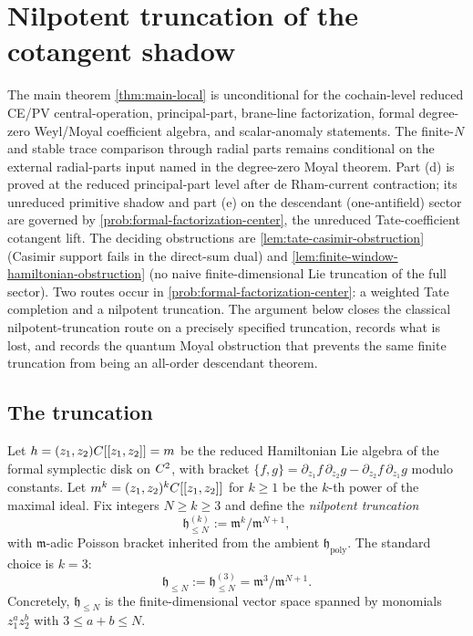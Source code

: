 
\section*{Nilpotent truncation of the cotangent shadow}

The main theorem \ref{thm:main-local} is unconditional for the
cochain-level reduced CE/PV central-operation, principal-part, brane-line factorization,
formal degree-zero Weyl/Moyal coefficient algebra, and scalar-anomaly
statements.  The finite-\(N\) and stable trace comparison through
radial parts remains conditional on the external radial-parts input
named in the degree-zero Moyal theorem.
Part (d) is proved at the reduced principal-part level after de Rham-current contraction;
its unreduced primitive shadow and part (e) on the descendant
(one-antifield) sector are governed by
\ref{prob:formal-factorization-center}, the unreduced Tate-coefficient
cotangent lift. The deciding obstructions are
\ref{lem:tate-casimir-obstruction} (Casimir support fails in the
direct-sum dual) and \ref{lem:finite-window-hamiltonian-obstruction}
(no naive finite-dimensional Lie truncation of the full sector). Two
routes occur in \ref{prob:formal-factorization-center}: a
weighted Tate completion and a nilpotent truncation. The argument below
closes the classical nilpotent-truncation route on a precisely specified
truncation, records what is lost, and records the quantum
Moyal obstruction that prevents the same finite truncation from being
an all-order descendant theorem.

\subsection*{The truncation}

Let $h=(z_1,z_2)C[[z_1,z_2]]=m$ be the reduced
Hamiltonian Lie algebra of the formal symplectic disk on $C^2$, with
bracket $\{f,g\}=\partial_{z_1}f\,\partial_{z_2}g-
\partial_{z_2}f\,\partial_{z_1}g$ modulo constants. Let
$m^k=(z_1,z_2)^kC[[z_1,z_2]]$ for $k\geq 1$ be the
$k$-th power of the maximal ideal. Fix integers $N\geq k\geq 3$ and
define the \emph{nilpotent truncation}
$$\mathfrak h_{\leq N}^{(k)}:=\mathfrak m^k/\mathfrak m^{N+1},$$
with $\mathfrak m$-adic Poisson bracket inherited from the
ambient $\mathfrak h_{\mathrm{poly}}$. The standard choice is
$k=3$:
$$\mathfrak h_{\leq N}:=\mathfrak h_{\leq N}^{(3)}=
  \mathfrak m^3/\mathfrak m^{N+1}.$$
Concretely, $\mathfrak h_{\leq N}$ is the finite-dimensional vector
space spanned by monomials $z_1^az_2^b$ with $3\leq a+b\leq N$.

